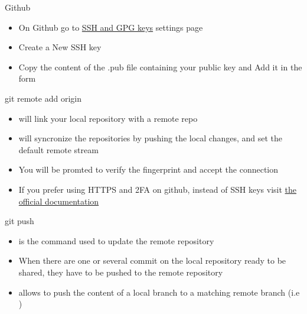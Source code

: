 \begin{frame}[fragile]{Github \insertcontinuationtext}
    \begin{itemize}[<+->] 
        \item On Github go to \alert{\href{https://github.com/settings/keys}{SSH and GPG keys}} settings page
        \item Create a New SSH key
        \item Copy the content of the .pub file containing your public key and Add it in the form
    \end{itemize}
\end{frame}

\begin{frame}[fragile]{git remote add origin}
    \begin{itemize}[<+->] 
        \item {} will link your local repository with a remote repo
        \item {} will syncronize the repositories by \alert{pushing} the local changes, and set the default remote stream
        \item You will be promted to verify the fingerprint and accept the connection
        \item If you prefer using HTTPS and 2FA on github, instead of SSH keys visit \href{https://docs.github.com/en/github/getting-started-with-github/about-remote-repositories#cloning-with-https-urls}{the official documentation}
    \end{itemize}
\end{frame}

\begin{frame}[fragile]{git push}
    \begin{itemize}[<+->] 
        \item {} is the command used to update the remote repository
        \item When there are one or several commit on the local repository ready to be shared, they have to be pushed to the remote repository
        \item {} allows to push the content of a local branch to a matching remote branch (i.e )
    \end{itemize}
\end{frame}

